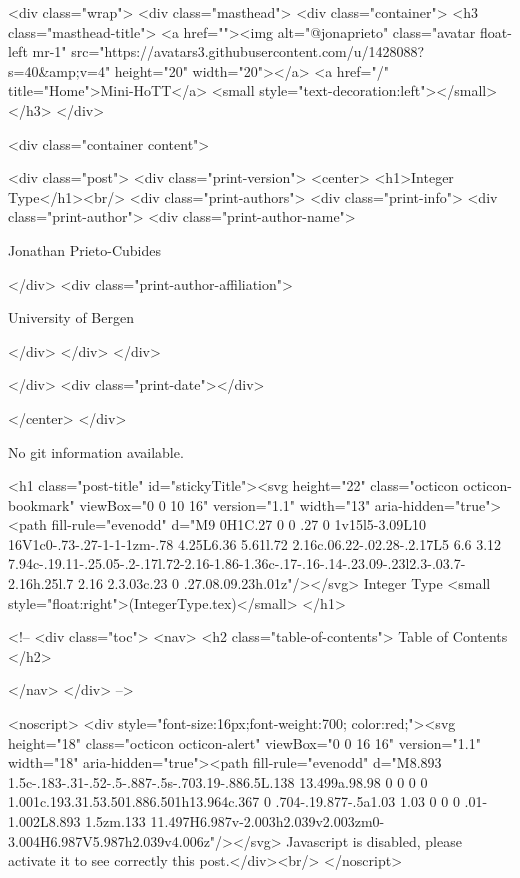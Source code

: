     <div class="wrap">
      <div class="masthead">
        <div class="container">
          <h3 class="masthead-title">
            <a href=""><img alt="@jonaprieto" class="avatar float-left mr-1" src="https://avatars3.githubusercontent.com/u/1428088?s=40&amp;v=4" height="20" width="20"></a>
            <a href="/" title="Home">Mini-HoTT</a>
            <small style="text-decoration:left"></small>
          </h3>
        </div>
      
      <div class="container content">
        







<div class="post">
  <div class="print-version">
    <center>
      <h1>Integer Type</h1><br/>
        <div class="print-authors">
          <div class="print-info">
            <div class="print-author">
              <div class="print-author-name">
                
                  Jonathan Prieto-Cubides
                
              </div>
              <div class="print-author-affiliation">
                
                  University of Bergen
                
                </div>
            </div>
          </div>
          
          
        </div>
        <div class="print-date"></div>
        
        
    </center>
  </div>

  
  No git information available.
  

  <h1 class="post-title" id="stickyTitle"><svg height="22" class="octicon octicon-bookmark" viewBox="0 0 10 16" version="1.1" width="13" aria-hidden="true"><path fill-rule="evenodd" d="M9 0H1C.27 0 0 .27 0 1v15l5-3.09L10 16V1c0-.73-.27-1-1-1zm-.78 4.25L6.36 5.61l.72 2.16c.06.22-.02.28-.2.17L5 6.6 3.12 7.94c-.19.11-.25.05-.2-.17l.72-2.16-1.86-1.36c-.17-.16-.14-.23.09-.23l2.3-.03.7-2.16h.25l.7 2.16 2.3.03c.23 0 .27.08.09.23h.01z"/></svg> Integer Type <small style="float:right">(IntegerType.tex)</small>
  </h1>

  <!-- 
  <div class="toc">
    <nav>
    <h2 class="table-of-contents"> Table of Contents </h2>
      

    </nav>
  </div>
   -->

  <noscript>
  <div style="font-size:16px;font-weight:700; color:red;"><svg height="18" class="octicon octicon-alert" viewBox="0 0 16 16" version="1.1" width="18" aria-hidden="true"><path fill-rule="evenodd" d="M8.893 1.5c-.183-.31-.52-.5-.887-.5s-.703.19-.886.5L.138 13.499a.98.98 0 0 0 0 1.001c.193.31.53.501.886.501h13.964c.367 0 .704-.19.877-.5a1.03 1.03 0 0 0 .01-1.002L8.893 1.5zm.133 11.497H6.987v-2.003h2.039v2.003zm0-3.004H6.987V5.987h2.039v4.006z"/></svg> Javascript is disabled, please activate it to see correctly this post.</div><br/>
  </noscript>

